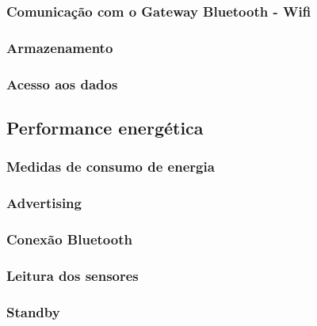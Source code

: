 \subsubsection{Comunicação com o Gateway Bluetooth - Wifi}

\subsubsection{Armazenamento}

\subsubsection{Acesso aos dados}

\subsection{Performance energética}

\subsubsection{Medidas de consumo de energia}

\subsubsection{Advertising}

\subsubsection{Conexão Bluetooth}

\subsubsection{Leitura dos sensores}

\subsubsection{Standby}